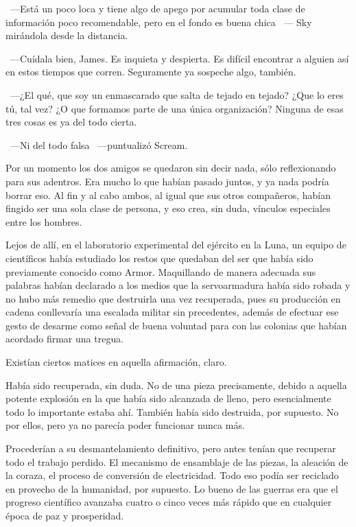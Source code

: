 ~---Está un poco loca y tiene algo de apego por acumular toda clase de información poco recomendable, pero en el fondo es buena chica ~--- Sky mirándola desde la distancia.

~---Cuídala bien, James. Es inquieta y despierta. Es difícil encontrar a alguien así en estos tiempos que corren. Seguramente ya sospeche algo, también.

~---¿El qué, que soy un enmascarado que salta de tejado en tejado? ¿Que lo eres tú, tal vez? ¿O que formamos parte de una única organización? Ninguna de esas tres cosas es ya del todo cierta.

~---Ni del todo falsa ~---puntualizó Scream.

Por un momento los dos amigos se quedaron sin decir nada, sólo reflexionando para sus adentros. Era mucho lo que habían pasado juntos, y ya nada podría borrar eso. Al fin y al cabo ambos, al igual que sus otros compañeros, habían fingido ser una sola clase de persona, y eso crea, sin duda, vínculos especiales entre los hombres.

\parbreak
Lejos de allí, en el laboratorio experimental del ejército en la Luna, un equipo de científicos había estudiado los restos que quedaban del ser que había sido previamente conocido como Armor. Maquillando de manera adecuada sus palabras habían declarado a los medios que la servoarmadura había sido robada y no hubo más remedio que destruirla una vez recuperada, pues su producción en cadena conllevaría una escalada militar sin precedentes, además de efectuar ese gesto de desarme como señal de buena voluntad para con las colonias que habían acordado firmar una tregua.

Existían ciertos matices en aquella afirmación, claro.

Había sido recuperada, sin duda. No de una pieza precisamente, debido a aquella potente explosión en la que había sido alcanzada de lleno, pero esencialmente todo lo importante estaba ahí. También había sido destruida, por supuesto. No por ellos, pero ya no parecía poder funcionar nunca más.

Procederían a su desmantelamiento definitivo, pero antes tenían que recuperar todo el trabajo perdido. El mecanismo de ensamblaje de las piezas, la aleación de la coraza, el proceso de conversión de electricidad. Todo eso podía ser reciclado en provecho de la humanidad, por supuesto. Lo bueno de las guerras era que el progreso científico avanzaba cuatro o cinco veces más rápido que en cualquier época de paz y prosperidad.

